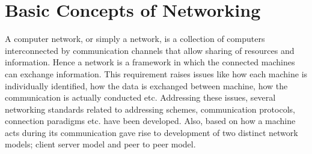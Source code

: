 \chapter{Basic Concepts of Networking}

A computer network, or simply a network, is a collection of computers  interconnected by communication channels that allow sharing of resources and information. Hence a network is a framework in which the connected machines can exchange information. This requirement raises issues like how each machine is individually identified, how the data is exchanged between machine, how the communication is actually conducted etc. Addressing these issues, several networking standards related to addressing schemes, communication protocols, connection paradigms etc. have been developed. Also, based on how a machine acts during its communication gave rise to development of two distinct network models; client server model and peer to peer model.







